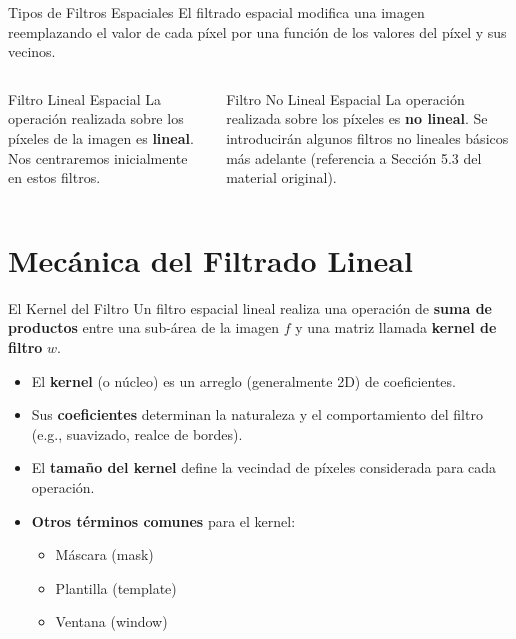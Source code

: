 \documentclass[10pt]{beamer}
\begin{document}
\begin{frame}{Tipos de Filtros Espaciales}
El filtrado espacial modifica una imagen reemplazando el valor de cada píxel por una función de los valores del píxel y sus vecinos.
\vspace{0.3cm}
\begin{columns}[T]
\begin{column}{0.5\textwidth}
\begin{alertblock}{Filtro Lineal Espacial}
La operación realizada sobre los píxeles de la imagen es \textbf{lineal}.
\vspace{0.1cm}
Nos centraremos inicialmente en estos filtros.
\end{alertblock}
\end{column}
\begin{column}{0.5\textwidth}
\begin{exampleblock}{Filtro No Lineal Espacial}
La operación realizada sobre los píxeles es \textbf{no lineal}.
\vspace{0.1cm}
Se introducirán algunos filtros no lineales básicos más adelante (referencia a Sección 5.3 del material original).
\end{exampleblock}
\end{column}
\end{columns}
\end{frame}

\section{Mecánica del Filtrado Lineal}

\begin{frame}{El Kernel del Filtro}
Un filtro espacial lineal realiza una operación de \textbf{suma de productos} entre una sub-área de la imagen $f$ y una matriz llamada \textbf{kernel de filtro} $w$.
\begin{itemize}
\item El \textbf{kernel} (o núcleo) es un arreglo (generalmente 2D) de coeficientes.
\item Sus \textbf{coeficientes} determinan la naturaleza y el comportamiento del filtro (e.g., suavizado, realce de bordes).
\item El \textbf{tamaño del kernel} define la vecindad de píxeles considerada para cada operación.
\item \textbf{Otros términos comunes} para el kernel:
{\footnotesize
\begin{itemize}
\item Máscara (mask)
\item Plantilla (template)
\item Ventana (window)
\end{itemize}
}
\end{itemize}
\end{frame}
\end{document}
